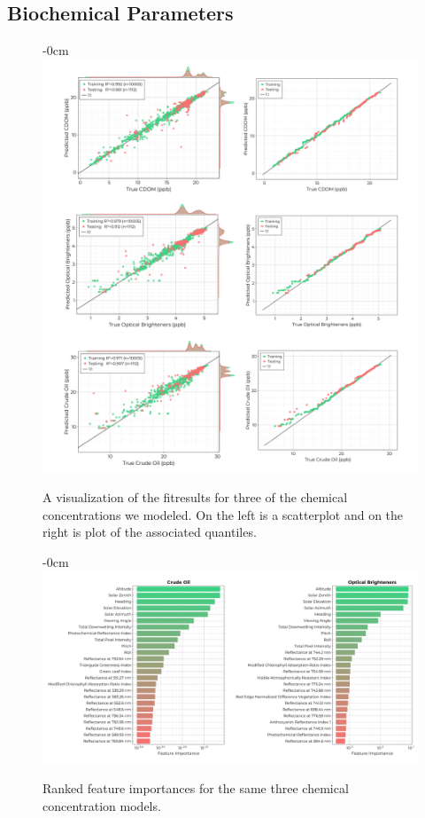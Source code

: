 \documentclass[journal,article,submit,pdftex,moreauthors]{Definitions/mdpi}
\begin{document}
\subsection{Biochemical Parameters}


\begin{figure}[H]
\begin{adjustwidth}{-\extralength}{0cm}
\centering
\includegraphics[width=16.0cm]{paper/figures/results/fits/chemical-fitres.pdf}
\end{adjustwidth}
\caption{A visualization of the fitresults for three of the chemical concentrations we modeled. On the left is a scatterplot and on the right is plot of the associated quantiles.\label{fig:chemicals-fit}}
\end{figure}  

\begin{figure}[H]
\begin{adjustwidth}{-\extralength}{0cm}
\centering
\includegraphics[width=18.0cm]{paper/figures/results/fits/chemical-ranking.pdf}
\end{adjustwidth}
\caption{Ranked feature importances for the same three chemical concentration models.\label{fig:chemicals-fit}}
\end{figure}  
\end{document}
